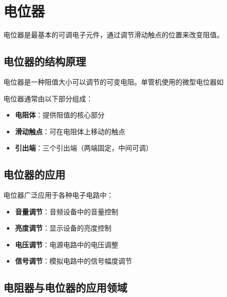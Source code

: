 \documentclass[12pt,UTF8]{ctexbook}
\begin{document}
\section{电位器}

电位器是最基本的可调电子元件，通过调节滑动触点的位置来改变阻值。

\subsection{电位器的结构原理}

电位器是一种阻值大小可以调节的可变电阻。单管机使用的微型电位器如%


电位器通常由以下部分组成：

\begin{itemize}[leftmargin=2cm]
	\item \textbf{电阻体}：提供阻值的核心部分
	\item \textbf{滑动触点}：可在电阻体上移动的触点
	\item \textbf{引出端}：三个引出端（两端固定，中间可调）
\end{itemize}

\subsection{电位器的应用}

电位器广泛应用于各种电子电路中：

\begin{itemize}[leftmargin=2cm]
	\item \textbf{音量调节}：音频设备中的音量控制
	\item \textbf{亮度调节}：显示设备的亮度控制
	\item \textbf{电压调节}：电源电路中的电压调整
	\item \textbf{信号调节}：模拟电路中的信号幅度调节
\end{itemize}

\subsection{电阻器与电位器的应用领域}
\end{document}
